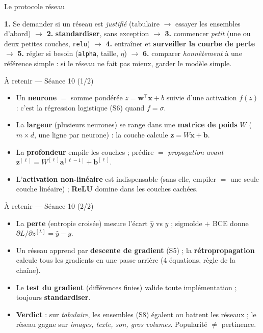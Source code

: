 \documentclass[aspectratio=169,11pt]{beamer}
\newcommand{\vx}{\mathbf{x}}
\newcommand{\va}{\mathbf{a}}
\newcommand{\vz}{\mathbf{z}}
\newcommand{\vb}{\mathbf{b}}
\newcommand{\vw}{\mathbf{w}}
\begin{document}
\begin{frame}{Le protocole réseau}
\begin{ucadret}
{\small \textbf{1.} Se demander si un réseau est \emph{justifié} (tabulaire $\to$ essayer les ensembles d'abord) $\to$ \textbf{2.} \textbf{standardiser}, sans exception $\to$ \textbf{3.} commencer \emph{petit} (une ou deux petites couches, \texttt{relu}) $\to$ \textbf{4.} entraîner et \textbf{surveiller la courbe de perte} $\to$ \textbf{5.} régler si besoin (\texttt{alpha}, taille, $\eta$) $\to$ \textbf{6.} comparer \emph{honnêtement} à une référence simple : si le réseau ne fait pas mieux, garder le modèle simple.}
\end{ucadret}
\end{frame}

\begin{frame}{À retenir — Séance 10 (1/2)}
\begin{ucadret}
\begin{itemize}\small
  \item Un \textbf{neurone} $=$ somme pondérée $z = \vw^\top\vx + b$ suivie d'une activation $f(z)$ : c'est la régression logistique (S6) quand $f = \sigma$.
  \item La \textbf{largeur} (plusieurs neurones) se range dans une \textbf{matrice de poids} $W$ ($m \times d$, une ligne par neurone) : la couche calcule $\vz = W\vx + \vb$.
  \item La \textbf{profondeur} empile les couches ; prédire $=$ \emph{propagation avant} $\vz^{[\ell]} = W^{[\ell]}\va^{[\ell-1]} + \vb^{[\ell]}$.
  \item L'\textbf{activation non-linéaire} est indispensable (sans elle, empiler $=$ une seule couche linéaire) ; \textbf{ReLU} domine dans les couches cachées.
\end{itemize}
\end{ucadret}
\end{frame}

\begin{frame}{À retenir — Séance 10 (2/2)}
\begin{ucadret}
\begin{itemize}\small
  \item La \textbf{perte} (entropie croisée) mesure l'écart $\hat y$ vs $y$ ; sigmoïde $+$ BCE donne $\partial L/\partial z^{[L]} = \hat y - y$.
  \item Un réseau apprend par \textbf{descente de gradient} (S5) ; la \textbf{rétropropagation} calcule tous les gradients en une passe arrière (4 équations, règle de la chaîne).
  \item Le \textbf{test du gradient} (différences finies) valide toute implémentation ; toujours \textbf{standardiser}.
  \item \textbf{Verdict} : sur \emph{tabulaire}, les ensembles (S8) égalent ou battent les réseaux ; le réseau gagne sur \emph{images, texte, son, gros volumes}. Popularité $\neq$ pertinence.
\end{itemize}
\end{ucadret}
\end{frame}
\end{document}
